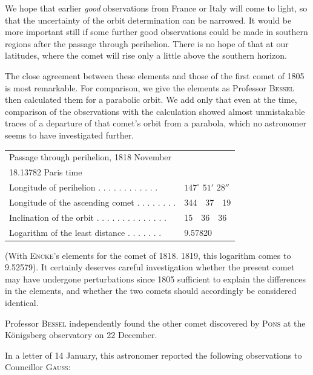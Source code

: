 \par\indent We hope that earlier \emph{good} observations from France or Italy will come to light, so that the uncertainty of the orbit determination can be narrowed. It would be more important still if some further good observations could be made in southern regions after the passage through perihelion. There is no hope of that at our latitudes, where the comet will rise only a little above the southern horizon.

\par\indent The close agreement between these elements and those of the first comet of 1805 is most remarkable. For comparison, we give the elements as Professor \textsc{Bessel} then calculated them for a parabolic orbit. We add only that even at the time, comparison of the observations with the calculation showed almost unmistakable traces of a departure of that comet’s orbit from a parabola, which no astronomer seems to have investigated further.

\begin{center}
\begin{tabular}{l l}
\multicolumn{2}{l}{Passage through perihelion, 1818 November} \\
\multicolumn{2}{l}{18.13782 Paris time} \\
Longitude of perihelion . . . . . . . . . . . . & $147^\circ$ $51'$ $28''$ \\
Longitude of the ascending comet . . . . . . . . & 344\ \ 37\ \ 19 \\
Inclination of the orbit . . . . . . . . . . . . . . & 15\ \ 36\ \ 36 \\
Logarithm of the least distance . . . . . . . & 9.57820 \\
\end{tabular}
\end{center}

\noindent (With \textsc{Encke}’s elements for the comet of 1818. 1819, this logarithm comes to 9.52579). It certainly deserves careful investigation whether the present comet may have undergone perturbations since 1805 sufficient to explain the differences in the elements, and whether the two comets should accordingly be considered identical.

\par\indent Professor \textsc{Bessel} independently found the other comet discovered by \textsc{Pons} at the Königsberg observatory on 22 December.

\par\indent In a letter of 14 January, this astronomer reported the following observations to Councillor \textsc{Gauss}:

